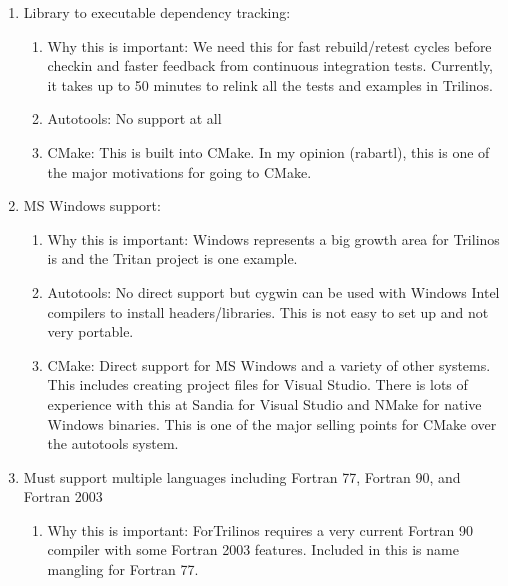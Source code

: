 \documentclass[pdf,ps2pdf,11pt]{SANDreport}
\begin{document}
\begin{enumerate}

{}\item Library to executable dependency tracking:

  \begin{enumerate}

  {}\item Why this is important: We need this for fast
  rebuild/retest cycles before checkin and faster feedback from
  continuous integration tests.  Currently, it takes up to 50
  minutes to relink all the tests and examples in Trilinos.

  {}\item Autotools: No support at all

  {}\item CMake: This is built into CMake.  In my opinion (rabartl),
  this is one of the major motivations for going to CMake.

  \end{enumerate}

{}\item MS Windows support:

  \begin{enumerate}

  {}\item Why this is important: Windows represents a big growth
  area for Trilinos is and the Tritan project is one example.

  {}\item Autotools: No direct support but cygwin can be used with
  Windows Intel compilers to install headers/libraries.  This is not
  easy to set up and not very portable.

  {}\item CMake: Direct support for MS Windows and a variety of
  other systems.  This includes creating project files for Visual
  Studio.  There is lots of experience with this at Sandia for
  Visual Studio and NMake for native Windows binaries.  This is one
  of the major selling points for CMake over the autotools system.

  \end{enumerate}

{}\item Must support multiple languages including Fortran 77,
Fortran 90, and Fortran 2003

  \begin{enumerate}

  {}\item Why this is important: ForTrilinos requires a very current
  Fortran 90 compiler with some Fortran 2003 features.  Included in
  this is name mangling for Fortran 77.


\end{enumerate}
\end{enumerate}
\end{document}

